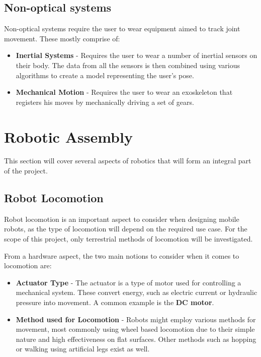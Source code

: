 \documentclass[12p,a4paper]{report}
\begin{document}
\newpage

\subsection{Non-optical systems}
Non-optical systems require the user to wear equipment aimed to track joint movement. These mostly comprise of:

\begin{itemize}
\item \textbf{Inertial Systems} - Requires the user to wear a number of inertial sensors on their body. The data from all the sensors is then combined using various algorithms to create a model representing the user's pose.
\item \textbf{Mechanical Motion} - Requires the user to wear an exoskeleton that registers his moves by mechanically driving a set of gears.
\end{itemize}


\section{Robotic Assembly}

This section will cover several aspects of robotics that will form an integral part of the project.


\subsection{Robot Locomotion}

Robot locomotion is an important aspect to consider when designing mobile robots, as the type of locomotion will depend on the required use case. For the scope of this project, only terrestrial methods of locomotion will be investigated.

From a hardware aspect, the two main notions to consider when it comes to locomotion are:

\begin{itemize}
\item \textbf{Actuator Type} - The actuator is a type of motor used for controlling a mechanical system. These convert energy, such as electric current or hydraulic pressure into movement. A common example is the \textbf{DC motor}.
\item \textbf{Method used for Locomotion} - Robots might employ various methods for movement, most commonly using wheel based locomotion due to their simple nature and high effectiveness on flat surfaces. Other methods such as hopping or walking using artificial legs exist as well.
\end{itemize}
\end{document}
